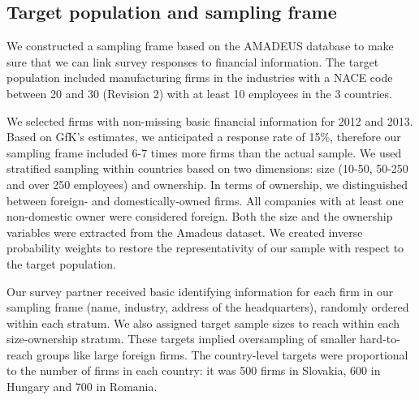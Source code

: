 \documentclass[final, dvipsnames, authoryear,12pt]{elsarticle}
\begin{document}

\subsection{Target population and sampling frame}

We constructed a sampling frame based on the AMADEUS database \citep{amadeus} to make sure that we can link survey responses to financial information. The target population included manufacturing firms in the industries with a NACE code between 20 and 30 (Revision 2) with at least 10 employees in the 3 countries.

We selected firms with non-missing basic financial information for 2012 and 2013. Based on GfK's estimates, we anticipated a response rate of 15\%, therefore our sampling frame included 6-7 times more firms than the actual sample. We used stratified sampling within countries based on two dimensions: size (10-50, 50-250 and over 250 employees) and ownership. In terms of ownership, we distinguished between foreign- and domestically-owned firms. All companies with at least one non-domestic owner were considered foreign. Both the size and the ownership variables were extracted from the Amadeus dataset. We created inverse probability weights to restore the representativity of our sample with respect to the target population.

Our survey partner received basic identifying information for each firm in our sampling frame (name, industry, address of the headquarters), randomly ordered within each stratum. We also assigned target sample sizes to reach within each size-ownership stratum. These targets implied oversampling of smaller hard-to-reach groups like large foreign firms. The country-level targets were proportional to the number of firms in each country: it was 500 firms in Slovakia, 600 in Hungary and 700 in Romania.


\end{document}
